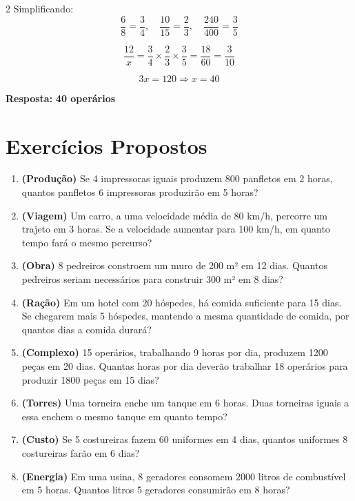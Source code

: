 \documentclass[11pt]{article}
\begin{document}
\begin{multicols}{2}
Simplificando:
\[
\frac{6}{8} = \frac{3}{4},\quad 
\frac{10}{15} = \frac{2}{3},\quad 
\frac{240}{400} = \frac{3}{5}
\]

\[
\frac{12}{x} = \frac{3}{4} \times \frac{2}{3} \times \frac{3}{5} = \frac{18}{60} = \frac{3}{10}
\]

\[
3x = 120 \Rightarrow x = 40
\]

\textbf{Resposta:} \textbf{40 operários}
\section*{Exercícios Propostos}

\begin{enumerate}[leftmargin=*]

\item \textbf{(Produção)} Se 4 impressoras iguais produzem 800 panfletos em 2 horas, quantos panfletos 6 impressoras produzirão em 5 horas?

\item \textbf{(Viagem)} Um carro, a uma velocidade média de 80 km/h, percorre um trajeto em 3 horas. Se a velocidade aumentar para 100 km/h, em quanto tempo fará o mesmo percurso?

\item \textbf{(Obra)} 8 pedreiros constroem um muro de 200 m² em 12 dias. Quantos pedreiros seriam necessários para construir 300 m² em 8 dias?

\item \textbf{(Ração)} Em um hotel com 20 hóspedes, há comida suficiente para 15 dias. Se chegarem mais 5 hóspedes, mantendo a mesma quantidade de comida, por quantos dias a comida durará?

\item \textbf{(Complexo)} 15 operários, trabalhando 9 horas por dia, produzem 1200 peças em 20 dias. Quantas horas por dia deverão trabalhar 18 operários para produzir 1800 peças em 15 dias?

\item \textbf{(Torres)} Uma torneira enche um tanque em 6 horas. Duas torneiras iguais a essa enchem o mesmo tanque em quanto tempo?

\item \textbf{(Custo)} Se 5 costureiras fazem 60 uniformes em 4 dias, quantos uniformes 8 costureiras farão em 6 dias?

\item \textbf{(Energia)} Em uma usina, 8 geradores consomem 2000 litros de combustível em 5 horas. Quantos litros 5 geradores consumirão em 8 horas?


\end{enumerate}
\end{multicols}
\end{document}
